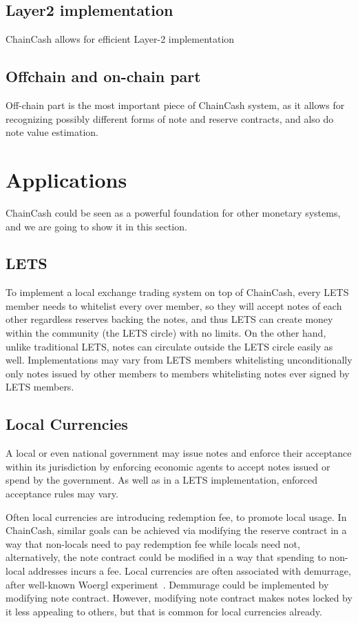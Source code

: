 \documentclass{article}   %
\newcommand{\authnote}[2]{\marginpar{\parbox{\marginparwidth}{\tiny %
  \textsf{#1 {\textcolor{blue}{notes: #2}}}}}%
  \textcolor{blue}{\textbf{\dag}}}
\newcommand{\authnote}[2]{
  \textsf{#1 \textcolor{blue}{: #2}}}
\newcommand{\authnote}[2]{}
\newcommand{\knote}[1]{{\authnote{\textcolor{green}{kushti notes}}{#1}}}
\newcommand{\cc}{ChainCash}
\begin{document}
\subsection{Layer2 implementation}

\cc{} allows for efficient Layer-2 implementation \knote{finish}


\subsection{Offchain and on-chain part}

Off-chain part is the most important piece of \cc{} system, as it allows for recognizing possibly different forms of note and reserve contracts, and also do note value estimation. 


\section{Applications}

\cc{} could be seen as a powerful foundation for other monetary systems, and we are going to show it in this section. 

\subsection{LETS}

To implement a local exchange trading system on top of \cc{}, every LETS member needs to whitelist every over member, so they will accept notes of each other regardless reserves backing the notes, and thus LETS can create money within the community (the LETS circle) with no limits. On the other hand, unlike traditional LETS, notes can circulate outside the LETS circle easily as well. Implementations may vary from LETS members whitelisting unconditionally only notes issued by other members to members whitelisting notes ever signed by LETS members. 


\subsection{Local Currencies}

A local or even national government may issue notes and enforce their acceptance within its jurisdiction by enforcing economic agents to accept notes issued or spend by the government. As well as in a LETS implementation, enforced acceptance rules may vary. 

Often local currencies are introducing redemption fee, to promote local usage. In \cc{}, similar goals can be achieved via modifying the reserve contract in a way that non-locals need to pay redemption fee while locals need not, alternatively, the note contract could be modified in a way that spending to non-local addresses incurs a fee. Local currencies are often associated with demurrage, after well-known Woergl experiment~\cite{unterguggenbercer1934end}. Demmurage could be implemented by modifying note contract. However, modifying note contract makes notes locked by it less appealing to others, but that is common for local currencies already.
\end{document}
